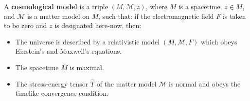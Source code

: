 A \textbf{cosmological model} is a triple $(M, \mathcal{M}, z)$, where $M$ is a spacetime, $z \in M$, and $\mathcal{M}$ is a matter model on $M$, such that: if the electromagnetic field $F$ is taken to be zero and $z$ is designated here-now, then:
\begin{itemize}
\item The universe is described by a relativistic model $(M, \mathcal{M}, F)$ which obeys Einstein's and Maxwell's equations.
\item The spacetime $M$ is maximal.
\item The stress-energy tensor $\hat{T}$ of the matter model $\mathcal{M}$ is normal and obeys the timelike convergence condition.
\end{itemize}
